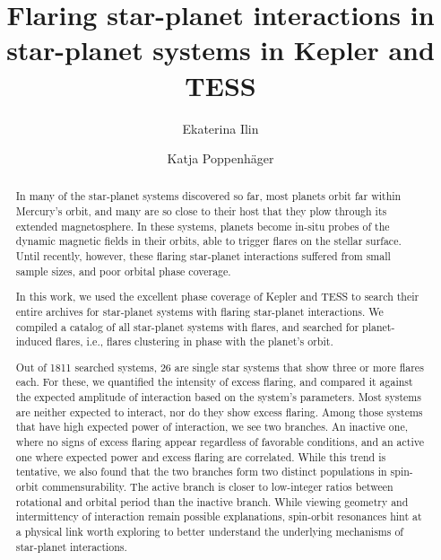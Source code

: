 \documentclass[twocolumn]{aastex631}
\begin{document}
\title{Flaring star-planet interactions in star-planet systems in Kepler and TESS}

\author{Ekaterina Ilin}
\author{Katja Poppenh\"ager}

\begin{abstract}
    In many of the star-planet systems discovered so far, most planets orbit far within Mercury's orbit, and many are so close to their host that they plow through its extended magnetosphere. In these systems, planets become in-situ probes of the dynamic magnetic fields in their orbits, able to trigger flares on the stellar surface. Until recently, however, these flaring star-planet interactions suffered from small sample sizes, and poor orbital phase coverage.

    In this work, we used the excellent phase coverage of Kepler and TESS to search their entire archives for star-planet systems with flaring star-planet interactions. We compiled a catalog of all star-planet systems with flares, and searched for planet-induced flares, i.e., flares clustering in phase with the planet's orbit. 

    Out of 1811 searched systems, 26 are single star systems that show three or more flares each. For these, we quantified the intensity of excess flaring, and compared it against the expected amplitude of interaction based on the system's parameters. Most systems are neither expected to interact, nor do they show excess flaring. Among those systems that have high expected power of interaction, we see two branches. An inactive one, where no signs of excess flaring appear regardless of favorable conditions, and an active one where expected power and excess flaring are correlated. While this trend is tentative, we also found that the two branches form two distinct populations in spin-orbit commensurability. The active branch is closer to low-integer ratios between rotational and orbital period than the inactive branch. While viewing geometry and intermittency of interaction remain possible explanations, spin-orbit resonances hint at a physical link worth exploring to better understand the underlying mechanisms of star-planet interactions.
\end{abstract}

\end{document}
